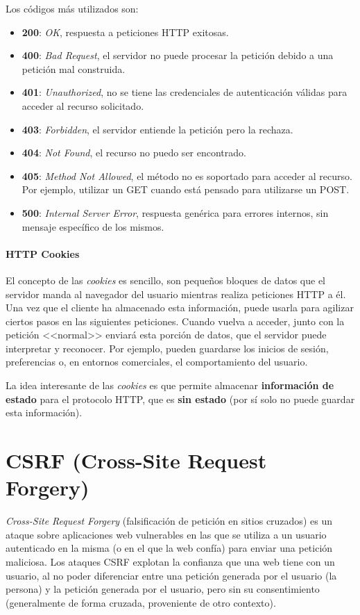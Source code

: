 Los códigos más utilizados son:

\begin{itemize}
	\item \textbf{200}: \emph{OK}, respuesta a peticiones HTTP exitosas.
  \item \textbf{400}: \emph{Bad Request}, el servidor no puede procesar la petición
  debido a una petición mal construida.
  \item \textbf{401}: \emph{Unauthorized}, no se tiene las credenciales de
  autenticación válidas para acceder al recurso solicitado.
  \item \textbf{403}: \emph{Forbidden}, el servidor entiende la petición pero la
  rechaza.
  \item \textbf{404}: \emph{Not Found}, el recurso no puedo ser encontrado.
  \item \textbf{405}: \emph{Method Not Allowed}, el método no es soportado para acceder
  al recurso. Por ejemplo, utilizar un GET cuando está pensado para utilizarse
  un POST.
  \item \textbf{500}: \emph{Internal Server Error}, respuesta genérica para errores
  internos, sin mensaje específico de los mismos.
\end{itemize}

\paragraph{HTTP Cookies}

El concepto de las \textit{cookies} es sencillo, son pequeños bloques de datos
que el servidor manda al navegador del usuario mientras realiza peticiones HTTP
a él. Una vez que el cliente ha almacenado esta información, puede usarla para
agilizar ciertos pasos en las siguientes peticiones. Cuando vuelva a acceder,
junto con la petición <<normal>> enviará esta porción de datos, que el servidor
puede interpretar y reconocer. Por ejemplo, pueden guardarse los inicios de
sesión, preferencias o, en entornos comerciales, el comportamiento del usuario.

La idea interesante de las \textit{cookies} es que permite almacenar
\textbf{información de estado} para el protocolo HTTP, que es \textbf{sin
estado} (por sí solo no puede guardar esta información).

\section{CSRF (Cross-Site Request Forgery)}
\emph{Cross-Site Request Forgery} (falsificación de petición en sitios cruzados)
es un ataque sobre aplicaciones web vulnerables en las que se utiliza a un
usuario autenticado en la misma (o en el que la web confía) para enviar una
petición maliciosa. Los ataques CSRF explotan la confianza que una web tiene con
un usuario, al no poder diferenciar entre una petición generada por el usuario
(la persona) y la petición generada por el usuario, pero sin su consentimiento
~\cite{csrf} (generalmente de forma cruzada, proveniente de otro contexto).

